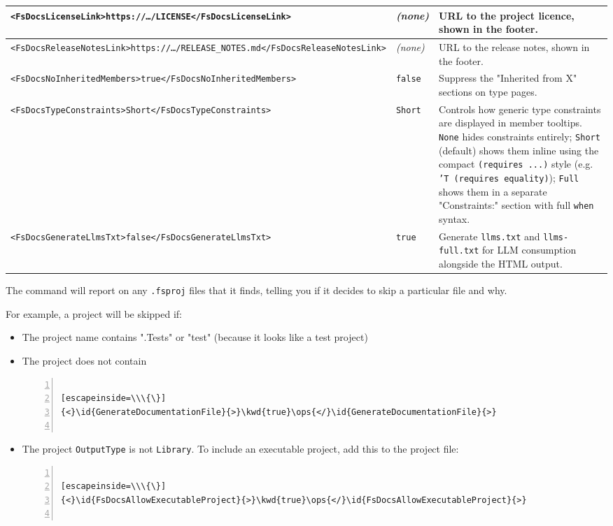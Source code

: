 \documentclass{article}
\newcommand{\id}[1]{\textcolor{black}{#1}}
\newcommand{\kwd}[1]{\textcolor{navy}{#1}}
\newcommand{\ops}[1]{\textcolor{purple}{#1}}
\begin{document}
\begin{tabular}{|l|l|l|}
\texttt{<FsDocsLicenseLink>https://…/LICENSE</FsDocsLicenseLink>} & \emph{(none)} & URL to the project licence, shown in the footer.\\ \hline
\texttt{<FsDocsReleaseNotesLink>https://…/RELEASE\_NOTES.md</FsDocsReleaseNotesLink>} & \emph{(none)} & URL to the release notes, shown in the footer.\\ \hline
\texttt{<FsDocsNoInheritedMembers>true</FsDocsNoInheritedMembers>} & \texttt{false} & Suppress the "Inherited from X" sections on type pages.\\ \hline
\texttt{<FsDocsTypeConstraints>Short</FsDocsTypeConstraints>} & \texttt{Short} & Controls how generic type constraints are displayed in member tooltips. \texttt{None} hides constraints entirely; \texttt{Short} (default) shows them inline using the compact \texttt{(requires ...)} style (e.g. \texttt{'T (requires equality)}); \texttt{Full} shows them in a separate "Constraints:" section with full \texttt{when} syntax.\\ \hline
\texttt{<FsDocsGenerateLlmsTxt>false</FsDocsGenerateLlmsTxt>} & \texttt{true} & Generate \texttt{llms.txt} and \texttt{llms-full.txt} for LLM consumption alongside the HTML output.\\ \hline
\end{tabular}



The command will report on any \texttt{.fsproj} files that it finds, telling you if it decides to skip a particular file and why.


For example, a project will be skipped if:
\begin{itemize}
\item 

The project name contains ".Tests" or "test" (because it looks like a test project)

\item 

The project does not contain
\begin{lstlisting}[numbers=left]

[escapeinside=\\\{\}]
{<}\id{GenerateDocumentationFile}{>}\kwd{true}\ops{</}\id{GenerateDocumentationFile}{>}


\end{lstlisting}


\item 

The project \texttt{OutputType} is not \texttt{Library}. To include an executable project, add this to the project file:
\begin{lstlisting}[numbers=left]

[escapeinside=\\\{\}]
{<}\id{FsDocsAllowExecutableProject}{>}\kwd{true}\ops{</}\id{FsDocsAllowExecutableProject}{>}


\end{lstlisting}


\end{itemize}
\end{document}
